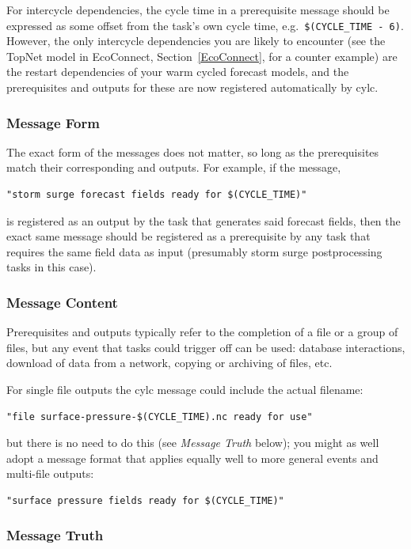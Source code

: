 \documentclass[11pt,a4paper]{article}
\begin{document}
For intercycle dependencies, the cycle time in a prerequisite message
should be expressed as some offset from the task's own cycle time, e.g.\
\lstinline=$(CYCLE_TIME - 6)=. However, the only intercycle dependencies
you are likely to encounter (see the TopNet model in EcoConnect,
Section~\ref{EcoConnect}, for a counter example) are the restart
dependencies of your warm cycled forecast models, and the prerequisites
and outputs for these are now registered automatically by cylc.

\subsubsection{Message Form}

The exact form of the messages does not matter, so long as the
prerequisites match their corresponding and outputs. For example, if
the message, 
\begin{lstlisting}
"storm surge forecast fields ready for $(CYCLE_TIME)"
\end{lstlisting} 
is registered as an output by the task that generates said forecast
fields, then the exact same message should be registered as a
prerequisite by any task that requires the same field data as input
(presumably storm surge postprocessing tasks in this case). 

\subsubsection{Message Content}

Prerequisites and outputs typically refer to the completion of a file
or a group of files, but any event that tasks could trigger off can be
used: database interactions, download of data from a network, copying
or archiving of files, etc.

For single file outputs the cylc message could include the actual
filename:
\begin{lstlisting}
"file surface-pressure-$(CYCLE_TIME).nc ready for use"
\end{lstlisting}
but there is no need to do this (see {\em Message Truth} below); you
might as well adopt a message format that applies equally well to
more general events and multi-file outputs:
\begin{lstlisting}
"surface pressure fields ready for $(CYCLE_TIME)"
\end{lstlisting}


\subsubsection{Message Truth}
\end{document}
